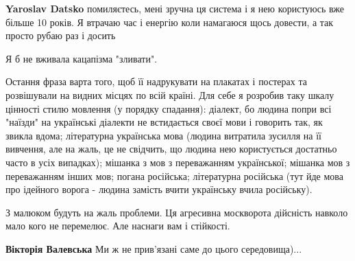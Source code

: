\begin{itemize}
\begin{itemize}
 
\textbf{Yaroslav Datsko} помиляєтесь, мені зручна ця система і я нею користуюсь вже більше 10 років. Я втрачаю час і енергію коли намагаюся щось довести, а так просто рубаю раз і досить
\end{itemize}

 
Я б не вживала кацапізма "зливати".


Остання фраза варта того, щоб її надрукувати на плакатах і постерах та
розвішували на видних місцях по всій країні. Для себе я розробив таку шкалу
цінності стилю мовлення (у порядку спадання): діалект, бо людина попри всі
"наїзди" на українські діалекти не встидається своєї мови і говорить так, як
звикла вдома; літературна українська мова (людина витратила зусилля на її
вивчення, але на жаль, це не свідчить, що людина нею користується достатньо
часто в усіх випадках); мішанка з мов з переважанням української; мішанка мов з
переважанням інших мов; погана російська; літературна російська (тут йде мова
про ідейного ворога - людина замість вчити українську вчила російську).

 
З малюком будуть на жаль проблеми. Ця агресивна москворота дійсність навколо
мало кого не перемелює. Але наснаги вам і стійкості.

\begin{itemize}
 
\textbf{Вікторія Валевська} Ми ж не прив'язані саме до цього середовища)...


\end{itemize}
\end{itemize}
